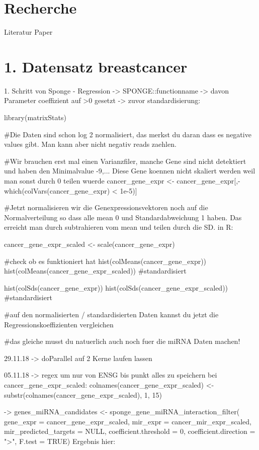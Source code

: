 
\section{Recherche}
Literatur Paper

\section{1. Datensatz breastcancer}
1. Schritt von Sponge - Regression
-> SPONGE::functionname
-> davon Parameter coeffizient auf >0 gesetzt
-> zuvor standardisierung:

library(matrixStats)

#Die Daten sind schon log 2 normalisiert, das merkst du daran dass es negative values gibt. Man kann aber nicht negativ reads zaehlen.

#Wir brauchen erst mal einen Varianzfiler, manche Gene sind nicht detektiert und haben den Minimalvalue -9,... Diese Gene koennen nicht skaliert werden weil man sonst durch 0 teilen wuerde
cancer_gene_expr <- cancer_gene_expr[,-which(colVars(cancer_gene_expr) < 1e-5)]

#Jetzt normalisieren wir die Genexpressionsvektoren noch auf die Normalverteilung so dass alle mean 0 und Standardabweichung 1 haben. Das erreicht man durch subtrahieren vom mean und teilen durch die SD. in R:

cancer_gene_expr_scaled <- scale(cancer_gene_expr)

#check ob es funktioniert hat
hist(colMeans(cancer_gene_expr)) 
hist(colMeans(cancer_gene_expr_scaled)) #standardisiert

hist(colSds(cancer_gene_expr)) 
hist(colSds(cancer_gene_expr_scaled)) #standardisiert

#auf den normalisierten / standardisierten Daten kannst du jetzt die Regressionskoeffizienten vergleichen

#das gleiche musst du natuerlich auch noch fuer die miRNA Daten machen!

29.11.18
-> doParallel auf 2 Kerne laufen lassen

05.11.18 
-> regex um nur von ENSG bis punkt alles zu speichern bei cancer_gene_expr_scaled:
    colnames(cancer_gene_expr_scaled) <- substr(colnames(cancer_gene_expr_scaled), 1, 15)
    
->   genes_miRNA_candidates <- sponge_gene_miRNA_interaction_filter(
     gene_expr = cancer_gene_expr_scaled,
     mir_expr = cancer_mir_expr_scaled,
     mir_predicted_targets = NULL,
     coefficient.threshold = 0,
     coefficient.direction = ">",
     F.test = TRUE)
Ergebnis hier: 





